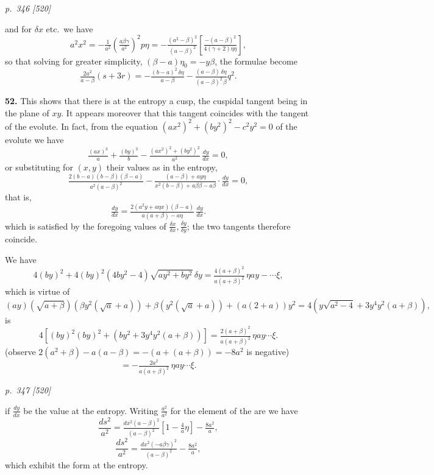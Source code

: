 \documentclass[11pt,a4paper]{article}
\theoremstyle{plain}
\theoremstyle{definition}
\begin{document}
\clearpage

\bigskip
\textit{p.~346 [520]}
\smallskip

and for $\delta x$ etc.\ we have
\[
a^2 x^2 = -\tfrac{1}{a^2}\!\left(\tfrac{a\beta\gamma}{a^2}\right)^2 p\eta = -\tfrac{(a^2 - \beta)^2}{(a - \beta)^2}\!\left[\tfrac{-(a - \beta)^2}{4(\gamma + 2)\eta\eta}\right],
\]
so that solving for greater simplicity, $(\beta - a)\eta_0 = -y\beta$, the formulae become
\[
\tfrac{2a^2}{a - \beta}(s + 3r) = -\tfrac{(b - a)^2 \, \delta\eta}{a - \beta} - \tfrac{(a - \beta) \, \delta\eta}{(a - \beta)^2 \, \beta} q^2.
\]

\textbf{52.} This shows that there is at the entropy a cusp, the cuspidal tangent being in the plane of $xy$. It appears moreover that this tangent coincides with the tangent of the evolute. In fact, from the equation $(ax^2)^2 + (by^2)^2 - c^2 y^2 = 0$ of the evolute we have
\[
\tfrac{(ax)^3}{a} + \tfrac{(by)^3}{b} - \tfrac{(ax^2)^2 + (by^2)^2}{a^2}\,\tfrac{dy}{dx} = 0,
\]
or substituting for $(x, y)$ their values as in the entropy,
\[
\tfrac{2(b - a)(b - \beta)(\beta - a)}{a^2(a - \beta)^2} - \tfrac{(a - \beta) + a y\eta}{x^2(b - \beta) + a\beta\beta - a\beta}\cdot\tfrac{dy}{dx} = 0,
\]
that is,
\[
\tfrac{dy}{dx} = \tfrac{2(a^2 y + a\eta x)(\beta - a)}{a(a + \beta) - a\eta}\,\tfrac{dy}{dx}.
\]
which is satisfied by the foregoing values of $\tfrac{\delta x}{\delta x}, \tfrac{\delta y}{\delta y}$; the two tangents therefore coincide.

We have
\[
4(by)^2 + 4(by)^2 (4by^2 - 4)\sqrt{a y^2 + b y^2}\,\delta y = \tfrac{4(a + \beta)^2}{a(a + \beta)^2}\,\eta a y - \cdots\xi,
\]
which is virtue of
\[
(ay)(\sqrt{a + \beta})(\beta y^2(\sqrt{a} + a)) + \beta(y^2(\sqrt{a} + a)) + (a(2 + a))y^2 = 4(y\sqrt{a^2 - 4} + 3y^4 y^2(a + \beta)),
\]
is
\[
4[(by)^2(by)^2 + (by^2 + 3y^4 y^2(a + \beta))] = \tfrac{2(a + \beta)^2}{a(a + \beta)^2}\,\eta a y \cdots\xi.
\]
(observe $2(a^2 + \beta) - a(a - \beta) = -(a + (a + \beta)) = -8a^2$ is negative)
\[
= -\tfrac{2a^2}{a(a + \beta)^2}\,\eta a y \cdots\xi.
\]

\clearpage

\bigskip
\textit{p.~347 [520]}
\smallskip

if $\tfrac{dy}{dx}$ be the value at the entropy. Writing $\tfrac{a^2}{a^2}$ for the element of the are we have
\[
\frac{ds^2}{a^2} = \tfrac{dx^2(a - \beta)^2}{(a - \beta)^2}\!\left[1 - \tfrac{4}{a}\eta\right] - \tfrac{8a^2}{a},
\]
\[
\frac{ds^2}{a^2} = \tfrac{dx^2(-a\beta\gamma)^2}{(a - \beta)^2} - \tfrac{8a^2}{a},
\]
which exhibit the form at the entropy.
\end{document}
